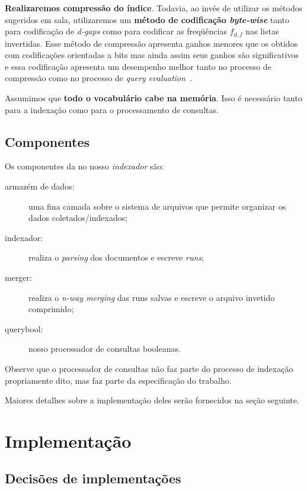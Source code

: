 \documentclass[10pt,twocolumn]{article}
\begin{document}
\textbf{Realizaremos compressão do índice}. Todavia, ao invés de
utilizar os métodos sugeridos em sala, utilizaremos um \textbf{método de
codificação \emph{byte-wise}} tanto para codificação de \emph{d-gaps}
como para codificar as freqüências \(f_{d,f}\) nas listas invertidas.
Esse método de compressão apresenta ganhos menores que os obtidos com
codificações orientadas a bits mas ainda assim seus ganhos são
significativos e essa codificação apresenta um desempenho melhor tanto
no processo de compressão como no processo de \emph{query
evaluation}~\cite{zobel2002fastquery}.

Assumimos que \textbf{todo o vocabulário cabe na memória}. Isso é necessário
tanto para a indexação como para o processamento de consultas.

\subsection{Componentes}


Os componentes da no nosso \emph{indexador} são:
\begin{description}
\item[armazém de dados:] uma fina camada sobre o sistema de arquivos que
permite organizar os dados coletados/indexados;
\item[indexador:] realiza o \emph{parsing} dos documentos e escreve
\emph{runs};
\item[merger:] realiza o \emph{n-way merging} das runs salvas e escreve
o arquivo invetido comprimido;
\item[querybool:] nosso processador de consultas booleanas.
\end{description}


Observe que o processador de consultas não faz parte do processo de
indexação propriamente dito, mas faz parte da especificação do trabalho.

Maiores detalhes sobre a implementação deles serão fornecidos na seção
seguinte.


\section{Implementação}\label{sec:implementation}

\subsection{Decisões de implementações}
\end{document}

